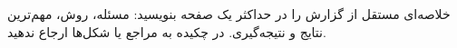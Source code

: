 
خلاصه‌ای مستقل از گزارش را در حداکثر یک صفحه بنویسید: مسئله، روش، مهم‌ترین نتایج و نتیجه‌گیری.
در چکیده به مراجع یا شکل‌ها ارجاع ندهید.

